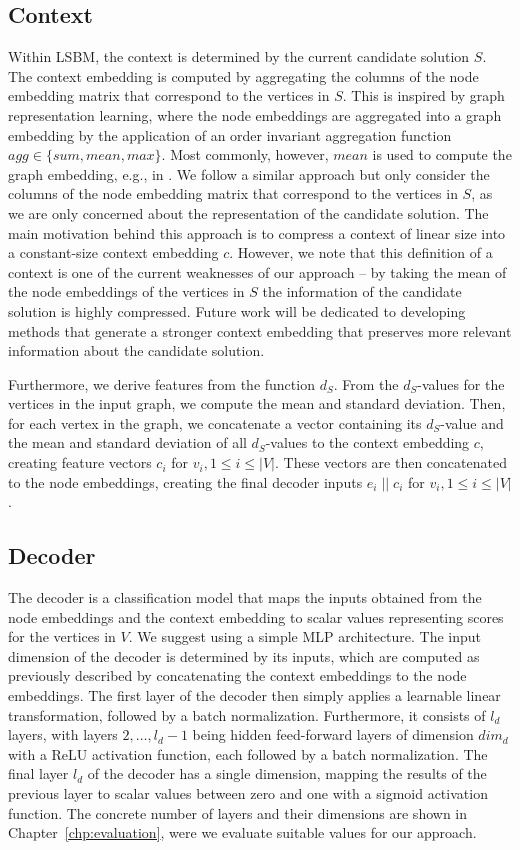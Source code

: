 \documentclass[draft,final]{vutinfth} %
\begin{document}
\subsection{Context}
Within LSBM, the context is determined by the current candidate solution $S$. The context embedding is computed by aggregating the columns of the node embedding matrix that correspond to the vertices in $S$. 
This is inspired by graph representation learning, where the node embeddings are aggregated into a graph embedding by the application of an order invariant aggregation function $\mathit{agg} \in \{\mathit{sum, mean, max}\}$. Most commonly, however, $\mathit{mean}$ is used to compute the graph embedding, e.g., in \cite{Kool2019}. 
We follow a similar approach but only consider the columns of the node embedding matrix that correspond to the vertices in $S$, as we are only concerned about the representation of the candidate solution. 
The main motivation behind this approach is to compress a context of linear size into a constant-size context embedding $c$. 
However, we note that this definition of a context is one of the current weaknesses of our approach -- by taking the mean of the node embeddings of the vertices in $S$ the information of the candidate solution is highly compressed. Future work will be dedicated to developing methods that generate a stronger context embedding that preserves more relevant information about the candidate solution. 

Furthermore, we derive features from the function $d_S$. From the $d_S$-values for the vertices in the input graph, we compute the mean and standard deviation. Then, for each vertex in the graph, we concatenate a vector containing its $d_S$-value and the mean and standard deviation of all $d_S$-values to the context embedding $c$, creating feature vectors $c_i$ for $v_i, 1 \leq i \leq |V|$. These vectors are then concatenated to the node embeddings, creating the final decoder inputs $e_i \; || \; c_i$ for $v_i, 1 \leq i \leq |V|$. 

\subsection{Decoder}
The decoder is a classification model that maps the inputs obtained from the node embeddings and the context embedding to scalar values representing scores for the vertices in $V$. We suggest using a simple MLP architecture. The input dimension of the decoder is determined by its inputs, which are computed as previously described by concatenating the context embeddings to the node embeddings. The first layer of the decoder then simply applies a learnable linear transformation, followed by a batch normalization. Furthermore, it consists of $l_d$ layers, with layers $2, \dots, l_d - 1$ being hidden feed-forward layers of dimension $\mathit{dim}_d$ with a ReLU activation function, each followed by a batch normalization. The final layer $l_d$ of the decoder has a single dimension, mapping the results of the previous layer to scalar values between zero and one with a sigmoid activation function. The concrete number of layers and their dimensions are shown in Chapter~\ref{chp:evaluation}, were we evaluate suitable values for our approach. 
\end{document}
